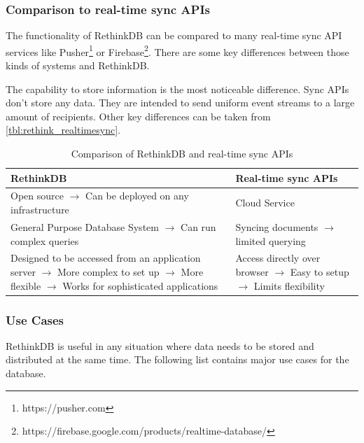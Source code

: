 \subsubsection{Comparison to real-time sync APIs}
The functionality of RethinkDB can be compared to many real-time sync API services like Pusher\footnote{https://pusher.com} or Firebase\footnote{https://firebase.google.com/products/realtime-database/}. There are some key differences between those kinds of systems and RethinkDB.

The capability to store information is the most noticeable difference. Sync APIs don't store any data. They are intended to send uniform event streams to a large amount of recipients. Other key differences can be taken from \autoref{tbl:rethink_realtimesync}.

\begin{table}[ht]
\caption{Comparison of RethinkDB and real-time sync APIs}
\label{tbl:rethink_realtimesync}
\centering
\begin{tabular}{|p{}|p{}|}
\hline
RethinkDB & Real-time sync APIs \\ \hline
Open source 
\newline
$\rightarrow$ Can be deployed on any infrastructure
&
Cloud Service \\ \hline
General Purpose Database System \newline
$\rightarrow$ Can run complex queries
&
Syncing documents
$\rightarrow$ limited querying\\ \hline
Designed to be accessed from an application server\newline
$\rightarrow$ More complex to set up \newline
$\rightarrow$ More flexible \newline
$\rightarrow$ Works for sophisticated applications
&
Access directly over browser \newline
$\rightarrow$ Easy to setup \newline
$\rightarrow$ Limits flexibility\\
\hline
\end{tabular}
\end{table}

\subsubsection{Use Cases}
RethinkDB is useful in any situation where data needs to be stored and distributed at the same time\autocite{rethinkdb:faq}. The following list contains major use cases for the database.

